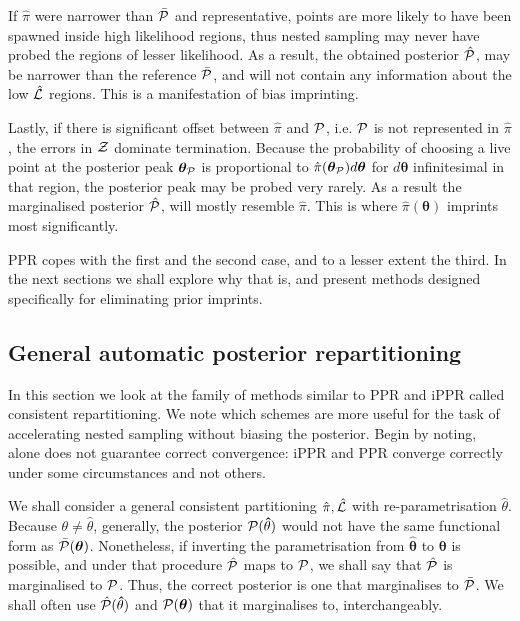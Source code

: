 \documentclass[usenatbib]{mnras}
\begin{document}
If $\hat{\pi}$ were narrower than $\bar{\cal P}$ and representative,
points are more likely to have been spawned inside high likelihood
regions, thus nested sampling may never have probed the regions of
lesser likelihood. As a result, the obtained posterior $\hat{\cal P}$,
may be narrower than the reference $\bar{\cal P}$, and will not
contain any information about the low $\hat{\cal L}$ regions. This is
a manifestation of bias imprinting.

Lastly, if there is significant offset between $\hat{\pi}$ and
${\cal P}$, i.e. ${\cal P}$ is not represented in $\hat{\pi}$, the
errors in ${\cal Z}$ dominate termination. Because the probability of
choosing a live point at the posterior peak \(\bm{\theta}_{{\cal P}}\)
is proportional to $\hat{\pi}(\bm{\theta}_{{\cal P}})d\bm{\theta}$ for
\(d\bm{\theta}\) infinitesimal in that region, the posterior peak may
be probed very rarely. As a result the marginalised posterior
$\hat{\cal P}$, will mostly resemble $\hat{\pi}$. This is where
$\hat{\pi}(\bm{\theta})$ imprints most significantly.

PPR copes with the first and the second case, and to a lesser extent
the third. In the next sections we shall explore why that is, and
present methods designed specifically for eliminating prior imprints.
\subsection{General automatic posterior repartitioning}\label{sec:gapr}

In this section we look at the family of methods similar to PPR and
iPPR called consistent repartitioning. We note which schemes are more
useful for the task of accelerating nested sampling without biasing
the posterior. Begin by noting,  alone does not
guarantee correct convergence: iPPR and PPR converge correctly under
some circumstances and not others.

We shall consider a general consistent partitioning
\(\hat{\pi}, \hat{\cal L}\) with re-parametrisation
\(\hat{\theta}\). Because $\theta \ne \hat{\theta}$, generally, the
posterior \({\cal P}(\bm\hat{\theta})\) would not have the same
functional form as \(\bar{\cal P}(\bm{\theta})\). Nonetheless, if
inverting the parametrisation from $\bm{\hat{\theta}}$ to $\bm{\theta}$
is possible, and under that procedure $\hat{\cal P}$ maps to
${\cal P}$, we shall say that $\hat{\cal P}$ is marginalised to
${\cal P}$. Thus, the correct posterior is one that marginalises to
$\bar{\cal P}$. We shall often use $\hat{\cal P}(\bm\hat{\theta})$ and
${\cal P}(\bm{\theta})$ that it marginalises to, interchangeably.
\end{document}
